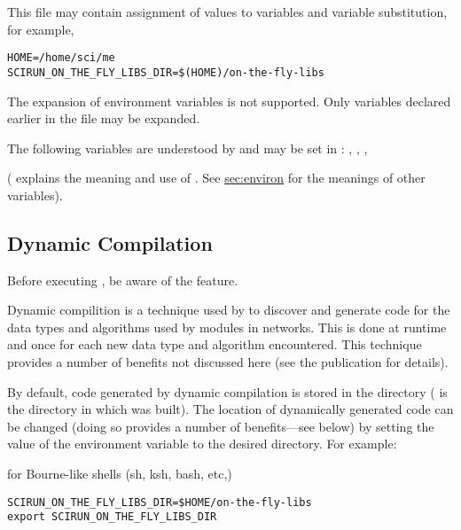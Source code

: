 This file may contain assignment of values to variables and variable
substitution, for example,

\begin{verbatim}
HOME=/home/sci/me
SCIRUN_ON_THE_FLY_LIBS_DIR=$(HOME)/on-the-fly-libs
\end{verbatim}

The expansion of environment variables is not supported.  Only
variables declared earlier in the file may be expanded.

The following variables are understood by \sr{} and may be set in
: ,
, ,

( explains the meaning and use
of .  See \hyperref{the
  previous section}{Section~}{}{sec:environ}
for the meanings of  other variables).

\subsection{Dynamic Compilation}
\label{sec:dyncomp}

Before executing \sr{},  be aware of the
 feature.

Dynamic compilition is a technique used by \sr{} to discover and
generate code for the data types and algorithms used by modules in
networks.  This is done at runtime and once for each new
data type and algorithm encountered.  This technique provides a number
of benefits not discussed here (see the publication 
for details).

By default, code generated by dynamic compilation is stored in the
directory  
( is the directory in which \sr{} was built).  The
location of dynamically generated code can be changed (doing so
provides a number of benefits---see below) by setting the value of the
environment variable  to the
desired directory. For example:

for Bourne-like shells (sh, ksh, bash, etc,)

\begin{verbatim}
SCIRUN_ON_THE_FLY_LIBS_DIR=$HOME/on-the-fly-libs
export SCIRUN_ON_THE_FLY_LIBS_DIR
\end{verbatim}


